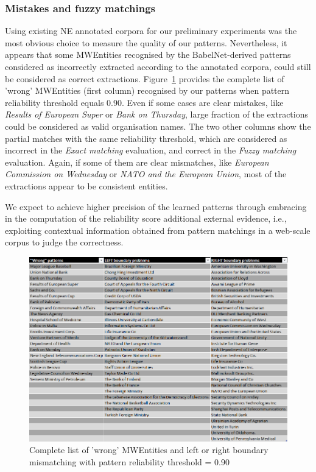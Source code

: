 \documentclass[output=paper]{langsci/langscibook}
\begin{document}
\subsubsection{Mistakes and fuzzy matchings}
Using existing NE annotated corpora for our preliminary experiments was the most obvious choice to measure the quality of our patterns. Nevertheless, it appears that some MWEntities recognised by the BabelNet-derived patterns considered as incorrectly extracted according to the annotated corpora, could still be considered as correct extractions.
Figure~\ref{jac:fig:error_analysis} provides the complete list of 'wrong' MWEntities (first column) recognised by our patterns when pattern reliability threshold equals 0.90. Even if some cases are clear mistakes, like \textit{Results of European Super} or \textit{Bank on Thursday}, large fraction of the extractions could be considered as valid organisation names. The two other columns show the partial matches with the same reliability threshold, which are considered as incorrect in the \emph{Exact matching} evaluation, and correct in the \emph{Fuzzy matching} evaluation. Again, if some of them are clear mismatches, like \textit{European Commission on Wednesday} or \textit{NATO and the European Union}, most of the extractions appear to be consistent entities.

We expect to achieve higher precision of the learned patterns through
embracing in the computation of the reliability score additional
external evidence, i.e., exploiting contextual information obtained
from pattern matchings in a web-scale corpus to judge the correctness.

\begin{figure}
\centering
\includegraphics[scale=0.54]{figures/error_analysis.png}

\caption{Complete list of 'wrong' MWEntities and left or right boundary mismatching with pattern reliability threshold = 0.90}
\label{jac:fig:error_analysis}
\end{figure}
\end{document}
